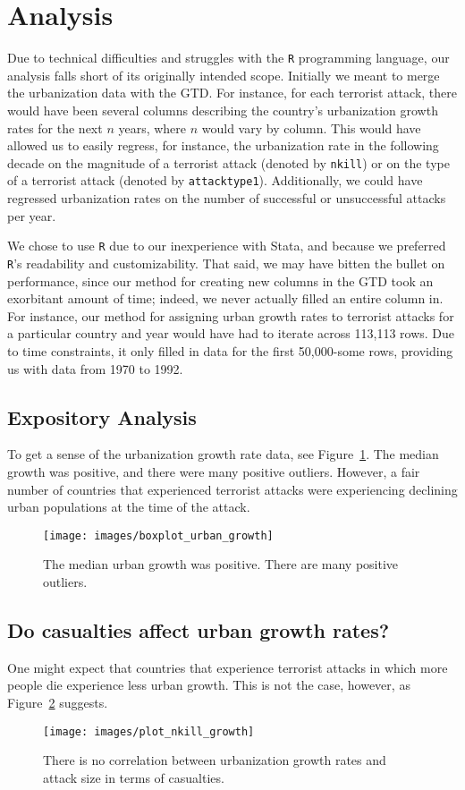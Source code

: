 \documentclass[preprint,2p,12pt]{elsarticle}
\begin{document}
\section{Analysis}
Due to technical difficulties and struggles with the {\tt R} programming language, our analysis falls short of its originally intended scope.
Initially we meant to merge the urbanization data with the GTD.
For instance, for each terrorist attack, there would have been several columns describing the country's urbanization growth rates for the next $n$ years, where $n$ would vary by column.
This would have allowed us to easily regress, for instance, the urbanization rate in the following decade on the magnitude of a terrorist attack (denoted by {\tt nkill}) or on the type of a terrorist attack (denoted by {\tt attacktype1}).
Additionally, we could have regressed urbanization rates on the number of successful or unsuccessful attacks per year.

We chose to use {\tt R} due to our inexperience with Stata, and because we preferred {\tt R}'s readability and customizability.
That said, we may have bitten the bullet on performance, since our method for creating new columns in the GTD took an exorbitant amount of time; indeed, we never actually filled an entire column in.
For instance, our method for assigning urban growth rates to terrorist attacks for a particular country and year would have had to iterate across 113,113 rows.
Due to time constraints, it only filled in data for the first 50,000-some rows, providing us with data from 1970 to 1992.

\subsection{Expository Analysis}
To get a sense of the urbanization growth rate data, see Figure~\ref{boxplot_urban_growth}. The median growth was positive, and there were many positive outliers. However, a fair number of countries that experienced terrorist attacks were experiencing declining urban populations at the time of the attack.
\begin{figure}[h!]
  \centering
  \texttt{[image: images/boxplot\_urban\_growth]}
  \caption{\label{boxplot_urban_growth}The median urban growth was positive. There are many positive outliers.}
\end{figure}

\subsection{Do casualties affect urban growth rates?}
One might expect that countries that experience terrorist attacks in which more people die experience less urban growth. This is not the case, however, as Figure~\ref{plot_nkill_growth} suggests.
\begin{figure}[h!]
  \centering
  \texttt{[image: images/plot\_nkill\_growth]}
  \caption{\label{plot_nkill_growth}There is no correlation between urbanization growth rates and attack size in terms of casualties.}
\end{figure}
\end{document}
